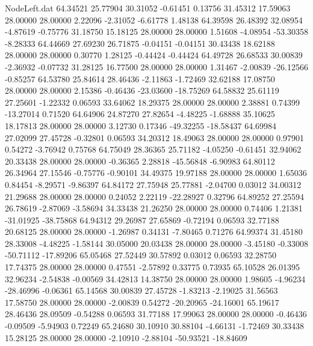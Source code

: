 \begin{filecontents}{NodeLeft.dat}
  64.34521   25.77904   30.31052    -0.61451    0.13756   31.45312   17.59063   28.00000   28.00000    2.22096   -2.31052   -6.61778    1.48138
  64.39598   26.48392   32.08954    -4.87619   -0.75776   31.18750   15.18125   28.00000   28.00000    1.51608   -4.08954  -53.30358   -8.28333
  64.44669   27.69230   26.71875    -0.04151   -0.04151   30.43438   18.62188   28.00000   28.00000    0.30770    1.28125   -0.44424   -0.44424
  64.49728   26.68533   30.00839    -2.36932   -0.07732   31.28125   16.77500   28.00000   28.00000    1.31467   -2.00839  -26.12566   -0.85257
  64.53780   25.84614   28.46436    -2.11863   -1.72469   32.62188   17.08750   28.00000   28.00000    2.15386   -0.46436  -23.03600  -18.75269
  64.58832   25.61119   27.25601    -1.22332    0.06593   33.64062   18.29375   28.00000   28.00000    2.38881    0.74399  -13.27014    0.71520
  64.64906   24.87270   27.82654    -4.48225   -1.68888   35.10625   18.17813   28.00000   28.00000    3.12730    0.17346  -49.32255  -18.58437
  64.69984   27.02099   27.45728    -0.32801    0.06593   34.20312   18.49063   28.00000   28.00000    0.97901    0.54272   -3.76942    0.75768
  64.75049   28.36365   25.71182    -4.05250   -0.61451   32.94062   20.33438   28.00000   28.00000   -0.36365    2.28818  -45.56848   -6.90983
  64.80112   26.34964   27.15546    -0.75776   -0.90101   34.49375   19.97188   28.00000   28.00000    1.65036    0.84454   -8.29571   -9.86397
  64.84172   27.75948   25.77881    -2.04700    0.03012   34.00312   21.29688   28.00000   28.00000    0.24052    2.22119  -22.28927    0.32796
  64.89252   27.25594   26.78619    -2.87069   -3.58694   34.33438   21.26250   28.00000   28.00000    0.74406    1.21381  -31.01925  -38.75868
  64.94312   29.26987   27.65869    -0.72194    0.06593   32.77188   20.68125   28.00000   28.00000   -1.26987    0.34131   -7.80465    0.71276
  64.99374   31.45180   28.33008    -4.48225   -1.58144   30.05000   20.03438   28.00000   28.00000   -3.45180   -0.33008  -50.71112  -17.89206
  65.05468   27.52449   30.57892     0.03012    0.06593   32.28750   17.74375   28.00000   28.00000    0.47551   -2.57892    0.33775    0.73935
  65.10528   26.01395   32.96234    -2.54838   -0.00569   34.42813   14.38750   28.00000   28.00000    1.98605   -4.96234  -28.46996   -0.06361
  65.14568   30.00839   27.45728    -1.83213   -2.19025   31.56563   17.58750   28.00000   28.00000   -2.00839    0.54272  -20.20965  -24.16001
  65.19617   28.46436   28.09509    -0.54288    0.06593   31.77188   17.99063   28.00000   28.00000   -0.46436   -0.09509   -5.94903    0.72249
  65.24680   30.10910   30.88104    -4.66131   -1.72469   30.33438   15.28125   28.00000   28.00000   -2.10910   -2.88104  -50.93521  -18.84609

\end{filecontents}
